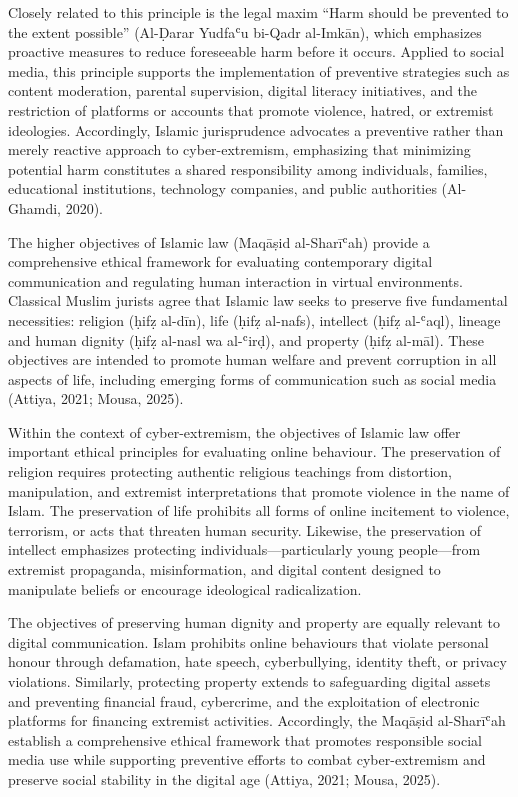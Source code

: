 \documentclass{NSP1}
\begin{document}
Closely related to this principle is the legal maxim “Harm should be prevented to the extent possible” (Al-Ḍarar Yudfaʿu bi-Qadr al-Imkān), which emphasizes proactive measures to reduce foreseeable harm before it occurs. Applied to social media, this principle supports the implementation of preventive strategies such as content moderation, parental supervision, digital literacy initiatives, and the restriction of platforms or accounts that promote violence, hatred, or extremist ideologies. Accordingly, Islamic jurisprudence advocates a preventive rather than merely reactive approach to cyber-extremism, emphasizing that minimizing potential harm constitutes a shared responsibility among individuals, families, educational institutions, technology companies, and public authorities (Al-Ghamdi, 2020).

\par\medskip{}\smallskip

The higher objectives of Islamic law (Maqāṣid al-Sharīʿah) provide a comprehensive ethical framework for evaluating contemporary digital communication and regulating human interaction in virtual environments. Classical Muslim jurists agree that Islamic law seeks to preserve five fundamental necessities: religion (ḥifẓ al-dīn), life (ḥifẓ al-nafs), intellect (ḥifẓ al-ʿaql), lineage and human dignity (ḥifẓ al-nasl wa al-ʿirḍ), and property (ḥifẓ al-māl). These objectives are intended to promote human welfare and prevent corruption in all aspects of life, including emerging forms of communication such as social media (Attiya, 2021; Mousa, 2025).

Within the context of cyber-extremism, the objectives of Islamic law offer important ethical principles for evaluating online behaviour. The preservation of religion requires protecting authentic religious teachings from distortion, manipulation, and extremist interpretations that promote violence in the name of Islam. The preservation of life prohibits all forms of online incitement to violence, terrorism, or acts that threaten human security. Likewise, the preservation of intellect emphasizes protecting individuals—particularly young people—from extremist propaganda, misinformation, and digital content designed to manipulate beliefs or encourage ideological radicalization.

The objectives of preserving human dignity and property are equally relevant to digital communication. Islam prohibits online behaviours that violate personal honour through defamation, hate speech, cyberbullying, identity theft, or privacy violations. Similarly, protecting property extends to safeguarding digital assets and preventing financial fraud, cybercrime, and the exploitation of electronic platforms for financing extremist activities. Accordingly, the Maqāṣid al-Sharīʿah establish a comprehensive ethical framework that promotes responsible social media use while supporting preventive efforts to combat cyber-extremism and preserve social stability in the digital age (Attiya, 2021; Mousa, 2025).
\end{document}
